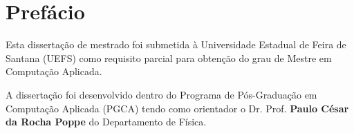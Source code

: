 \chapter*{Prefácio}

Esta dissertação de mestrado foi submetida à Universidade Estadual de Feira de Santana (UEFS) como requisito parcial para obtenção do grau de Mestre em Computação Aplicada. 

A dissertação foi desenvolvido dentro do  Programa de Pós-Graduação em Computação Aplicada (PGCA) tendo como orientador o Dr. Prof. \textbf{Paulo César da Rocha Poppe} do Departamento de Física.

\cleardoublepage